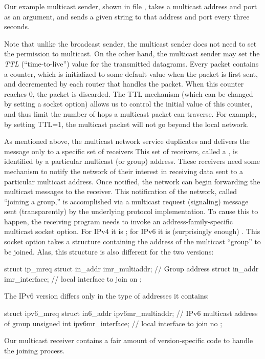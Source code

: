 Our example multicast sender, shown in file
, takes a multicast address and
port as an argument, and sends a given string to that address and port
every three seconds.


Note that unlike the broadcast sender, the
multicast sender does not need to set the
permission to multicast.  On the other hand, the multicast sender
may set the \emph{TTL\/} (``time-to-live'') value for the transmitted
datagrams.
Every packet contains a counter, which is initialized to
some default value when the packet is first sent,
and decremented by each router that handles the packet.  
When this counter reaches 0, the packet is discarded.  The TTL mechanism
(which can be changed by setting a socket option) allows us to
control the initial value of this counter, and thus
limit the number of hops a multicast packet can traverse.
For example, by setting TTL=1, the multicast packet  will not
go beyond the local network.

As mentioned above, the multicast network service duplicates and delivers
the message only to a specific set of receivers
This set of receivers, called a
, is identified by a particular
multicast (or group) address.
These receivers need some mechanism to notify the network of
their interest in receiving data sent to a particular multicast
address.  Once notified, the network can begin forwarding the multicast
messages to the receiver.  This notification of the network,
called ``joining a
group,'' is accomplished via a multicast request (signaling)
message sent
 (transparently)
by the underlying protocol implementation.  To cause this to 
happen, the receiving program needs to invoke an
address-family-specific  multicast socket option.
For IPv4 it is  ; for IPv6 it is 
(surprisingly enough) .
This socket option takes a structure containing the address of the
multicast ``group'' to be joined.  Alas, this structure is
also different for the
two versions:
\begin{inlinecode}
struct ip_mreq {
  struct in_addr imr_multiaddr; // Group address
  struct in_addr imr_interface; // local interface to join on
};
\end{inlinecode}
The IPv6 version differs only in the type of addresses it contains:
\begin{inlinecode}
struct ipv6_mreq {
  struct in6_addr ipv6mr_multiaddr; // IPv6 multicast address of group
  unsigned int ipv6mr_interface;    // local interface to join no
  };
\end{inlinecode}
Our multicast receiver contains
a fair amount of  version-specific code to handle the joining process.

